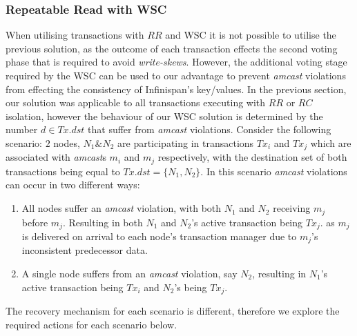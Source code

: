     \subsubsection*{Repeatable Read with WSC}
    When utilising transactions with $RR$ and WSC it is not possible to utilise the previous solution, as the outcome of each transaction effects the second voting phase that is required to avoid \emph{write-skews}.  However, the additional voting stage required by the WSC can be used to our advantage to prevent \emph{amcast} violations from effecting the consistency of Infinispan's key/values.  In the previous section, our solution was applicable to all transactions executing with $RR$ or $RC$ isolation, however the behaviour of our WSC solution is determined by the number $d \in Tx.dst$ that suffer from \emph{amcast} violations. Consider the following scenario: $2$ nodes, $N_1 \& N_2$ are participating in transactions $Tx_i$ and $Tx_j$ which are associated with \emph{amcast}s $m_i$ and $m_j$ respectively, with the destination set of both transactions being equal to $Tx.dst = \{N_1, N_2\}$.  In this scenario \emph{amcast} violations can occur in two different ways:    
    
    \begin{enumerate}
        \item All nodes suffer an \emph{amcast} violation, with both $N_1$ and $N_2$ receiving $m_j$ before $m_j$.  Resulting in both $N_1$ and $N_2$'s active transaction being $Tx_j$. as $m_j$ is delivered on arrival to each node's transaction manager due to $m_j$'s inconsistent predecessor data.  

        \item A single node suffers from an \emph{amcast} violation, say $N_2$, resulting in $N_1$'s active transaction being $Tx_i$ and $N_2$'s being $Tx_j$.  
    \end{enumerate}
    
    The recovery mechanism for each scenario is different, therefore we explore the required actions for each scenario below.  
    
